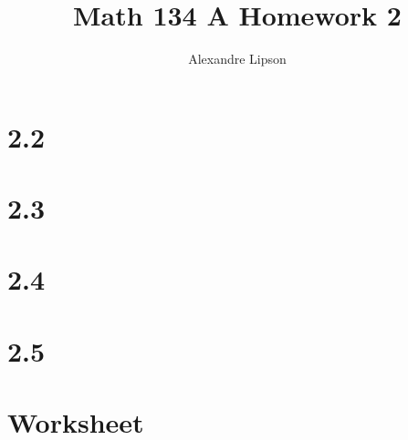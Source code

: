 \documentclass{article}
\title{Math 134 A Homework 2}
\author{Alexandre Lipson}
\begin{document}
\maketitle

\section*{2.2}


\section*{2.3}


\section*{2.4}


\section*{2.5}


\section*{Worksheet}


\end{document}
